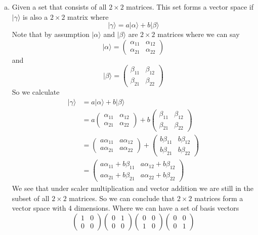 \documentclass[11pt]{article}
\numberwithin{equation}{section}
\newcommand{\vect}[1]{|{#1}\rangle}
\begin{document}
\begin{enumerate}[(a)]
\item
Given a set that consists of all $2\times2$ matrices. This set forms a vector space if $\vect{\gamma}$ is also a $2\times2$ matrix where
$$\vect{\gamma} = a\vect{\alpha}+b\vect{\beta}$$
Note that by assumption $\vect{\alpha}$ and $\vect{\beta}$ are $2\times2$ matrices where we can say
$$\vect{\alpha} = \left(\begin{array}{cc}
	\alpha_{11}	&\alpha_{12}\\
	\alpha_{21}	&\alpha_{22}
		\end{array}\right)$$
and 
$$\vect{\beta} = \left(\begin{array}{cc}
	\beta_{11}	&\beta_{12}\\
	\beta_{21}	&\beta_{22}
		\end{array}\right)$$
So we calculate 
\begin{align*}
\vect{\gamma} &= a\vect{\alpha}+b\vect{\beta}\\
&= a\left(\begin{array}{cc}
	\alpha_{11}	&\alpha_{12}\\
	\alpha_{21}	&\alpha_{22}
		\end{array}\right) + 
	b\left(\begin{array}{cc}
	\beta_{11}	&\beta_{12}\\
	\beta_{21}	&\beta_{22}
		\end{array}\right)\\
&= \left(\begin{array}{cc}
	a\alpha_{11}	&a\alpha_{12}\\
	a\alpha_{21}	&a\alpha_{22}
		\end{array}\right) + 
	\left(\begin{array}{cc}
	b\beta_{11}	&b\beta_{12}\\
	b\beta_{21}	&b\beta_{22}
		\end{array}\right)\\
&= \left(\begin{array}{cc}
	a\alpha_{11}+b\beta_{11}	&a\alpha_{12}+b\beta_{12}\\
	a\alpha_{21}+b\beta_{21}	&a\alpha_{22}+b\beta_{22}
		\end{array}\right)  
\end{align*}
We see that under scaler multiplication and vector addition we are still in the subset of all $2\times2$ matrices. So we can conclude that $2\times2$ matrices form a vector space with 4 dimensions. Where we can have a set of basis vectors 
$$\left(\begin{array}{cc}
	1	&0\\
	0	&0
		\end{array}\right)
\left(\begin{array}{cc}
	0	&1\\
	0	&0
		\end{array}\right) 
\left(\begin{array}{cc}
	0	&0\\
	1	&0
		\end{array}\right) 
\left(\begin{array}{cc}
	0	&0\\
	0	&1
		\end{array}\right)$$ 


\end{enumerate}
\end{document}
